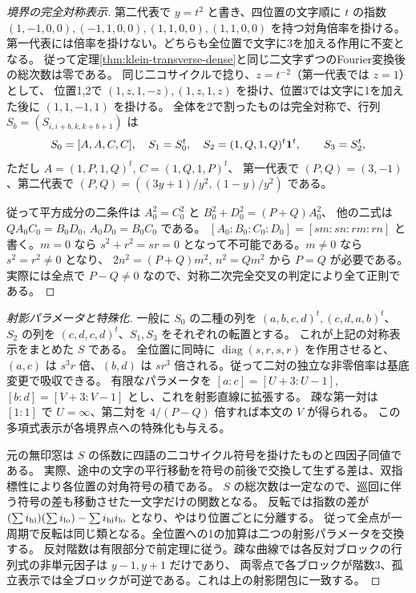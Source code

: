 \begin{proof}[境界の完全対称表示]
第二代表で $y=t^2$ と書き、四位置の文字順に $t$ の指数
$(1,-1,0,0),(-1,1,0,0),(1,1,0,0),(1,1,0,0)$ を持つ対角倍率を掛ける。
第一代表には倍率を掛けない。どちらも全位置で文字に3を加える作用に不変となる。
従って定理\ref{thm:klein-transverse-dense}と同じ二文字ずつのFourier変換後の総次数は零である。
同じ二コサイクルで捻り、$z=t^{-2}$（第一代表では $z=1$）として、
位置1,2で $(1,z,1,-z),(1,z,1,z)$ を掛け、位置3では文字に1を加えた後に $(1,1,-1,1)$ を掛ける。
全体を2で割ったものは完全対称で、行列 $S_b=(S_{i,i+b,k,k+b+1})$ は
\[
 S_0=[A,A,C,C],\quad S_1=S_0^t,\quad
 S_2=(1,Q,1,Q)^t{\bf1}^t,\qquad S_3=S_2^t,
\]
ただし $A=(1,P,1,Q)^t$, $C=(1,Q,1,P)^t$、
第一代表で $(P,Q)=(3,-1)$、第二代表で $(P,Q)=((3y+1)/y^2,(1-y)/y^2)$ である。

従って平方成分の二条件は $A_0^2=C_0^2$ と $B_0^2+D_0^2=(P+Q)A_0^2$、
他の二式は $Q A_0 C_0=B_0 D_0$, $A_0D_0=B_0 C_0$ である。
$[A_0:B_0:C_0:D_0]=[sm:sn:rm:rn]$ と書く。$m=0$ なら
$s^2+r^2=sr=0$ となって不可能である。$m\ne0$ なら $s^2=r^2\ne0$ となり、
$2n^2=(P+Q)m^2$, $n^2=Qm^2$ から $P=Q$ が必要である。
実際には全点で $P-Q\ne0$ なので、対称二次完全交叉の判定により全て正則である。
\end{proof}

\begin{proof}[射影パラメータと特殊化]
一般に $S_0$ の二種の列を $(a,b,c,d)^t,(c,d,a,b)^t$、
$S_2$ の列を $(c,d,c,d)^t$、$S_1,S_3$ をそれぞれの転置とする。
これが上記の対称表示をまとめた $S$ である。
全位置に同時に $\operatorname{diag}(s,r,s,r)$ を作用させると、
$(a,c)$ は $s^3r$ 倍、$(b,d)$ は $sr^3$ 倍される。従って二対の独立な非零倍率は基底変更で吸収できる。
有限なパラメータを $[a:c]=[U+3:U-1]$, $[b:d]=[V+3:V-1]$ とし、これを射影直線に拡張する。
疎な第一対は $[1:1]$ で $U=\infty$、第二対を $4/(P-Q)$ 倍すれば本文の $V$ が得られる。
この多項式表示が各境界点への特殊化も与える。

元の無印窓は $S$ の係数に四語の二コサイクル符号を掛けたものと四因子同値である。
実際、途中の文字の平行移動を符号の前後で交換して生ずる差は、双指標性により各位置の対角符号の積である。
$S$ の総次数は一定なので、巡回に伴う符号の差も移動させた一文字だけの関数となる。
反転では指数の差が $(\sum i_{\rm hi})(\sum i_{\rm lo})-\sum i_{\rm hi}i_{\rm lo}$ となり、やはり位置ごとに分離する。
従って全点が一周期で反転は同じ類となる。全位置への1の加算は二つの射影パラメータを交換する。
反対階数は有限部分で前定理に従う。疎な曲線では各反対ブロックの行列式の非単元因子は $y-1,y+1$ だけであり、
両零点で各ブロックが階数3、孤立表示では全ブロックが可逆である。これは上の射影閉包に一致する。
\end{proof}
